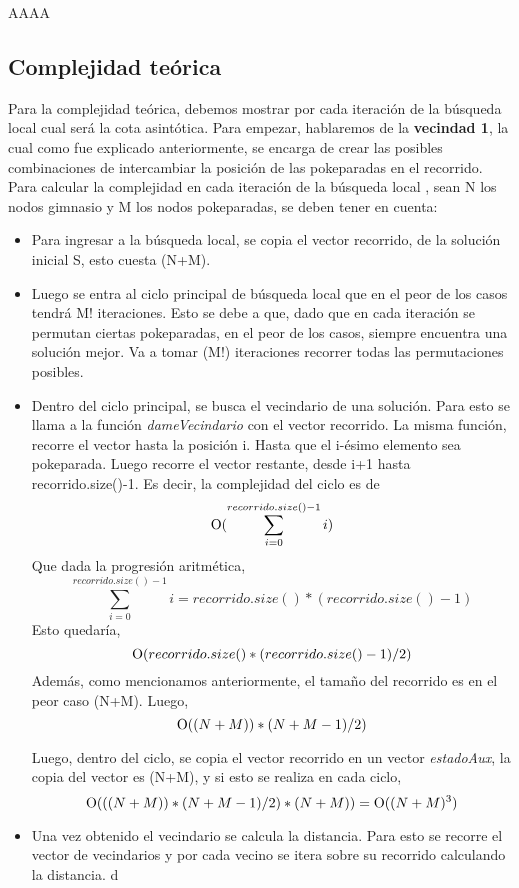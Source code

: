 AAAA
   
   
    \subsection{Complejidad teórica}
        Para la complejidad teórica, debemos mostrar por cada iteración de la búsqueda local cual será la cota asintótica. Para empezar, hablaremos de la  \textbf{vecindad 1}, la cual como fue explicado anteriormente, se encarga de crear las posibles combinaciones de intercambiar la posición de las pokeparadas en el recorrido. Para calcular la complejidad en cada iteración de la búsqueda local , sean N los nodos gimnasio y M los nodos pokeparadas, se deben tener en cuenta:

        \begin{itemize}
            \item Para ingresar a la búsqueda local, se copia el vector recorrido, de la solución inicial S, esto cuesta \ord(N+M).
            \item Luego se entra al ciclo principal de búsqueda local que en el peor de los casos tendrá M! iteraciones. Esto se debe a que, dado que en cada iteración se permutan ciertas pokeparadas, en el peor de los casos, siempre encuentra una solución mejor. Va a tomar \ord(M!) iteraciones recorrer todas las permutaciones posibles.
            \item Dentro del ciclo principal, se busca el vecindario de una solución. Para esto se llama a la función \emph{dameVecindario} con el vector recorrido.
            La misma función, recorre el vector hasta la posición i. Hasta que el i-ésimo elemento sea pokeparada. Luego recorre el vector restante, desde i+1 hasta recorrido.size()-1. Es decir, la complejidad del ciclo es de 
            \[
            \operatorname{O}(\sum_{i=0}^{recorrido.size()-1} i)
            \]
            Que dada la progresión aritmética,
            \[
            \sum_{i=0}^{recorrido.size()-1} i = recorrido.size()*(recorrido.size()-1)
            \]
            Esto quedaría,
            \[
            \operatorname{O}(recorrido.size()*(recorrido.size()-1)/2)
            \]
            Además, como mencionamos anteriormente, el tamaño del recorrido es en el peor caso \ord(N+M). Luego,
            \[
            \operatorname{O}((N+M))*(N+M-1)/2)
            \]

            Luego, dentro del ciclo, se copia el vector recorrido en un vector \emph{estadoAux}, la copia del vector es \ord(N+M), y si esto se realiza en cada ciclo,
             \[
            \operatorname{O}(((N+M))*(N+M-1)/2)*(N+M)) = \operatorname{O}((N+M)^{3})
            \]

            \item Una vez obtenido el vecindario se calcula la distancia. Para esto se recorre el vector de vecindarios y por cada vecino se itera sobre su recorrido calculando la distancia. d


        \end{itemize}

